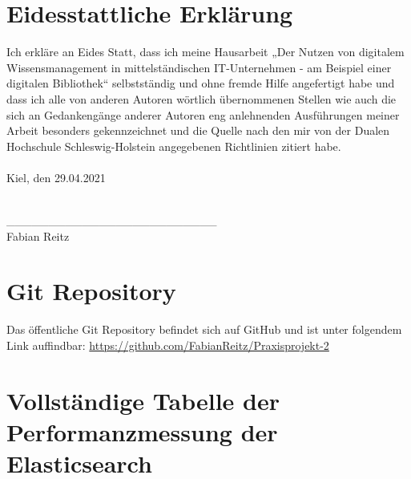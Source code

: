 \documentclass[a4paper]{scrartcl}
\begin{document}

\section*{Eidesstattliche Erklärung}


\onehalfspacing

Ich erkläre an Eides Statt, dass ich meine Hausarbeit „Der Nutzen von digitalem Wissensmanagement in mittelständischen IT-Unternehmen - am Beispiel einer digitalen Bibliothek“ selbstständig und ohne fremde Hilfe angefertigt habe und dass ich alle von anderen Autoren wörtlich übernommenen Stellen wie auch die sich an Gedankengänge anderer Autoren eng anlehnenden Ausführungen meiner Arbeit besonders gekennzeichnet und die Quelle nach den mir von der Dualen Hochschule Schleswig-Holstein angegebenen Richtlinien zitiert habe. \\ \\

Kiel, den 29.04.2021 \\ \\ 

\begin{tabbing}
	\_\_\_\_\_\_\_\_\_\_\_\_\_\_\_\_\_\_\_\_\_\_\_\_\_ \\
	Fabian Reitz
\end{tabbing}


\newpage

\appendix
\section{Git Repository}
Das öffentliche Git Repository befindet sich auf GitHub und ist unter folgendem Link auffindbar: \href{https://github.com/FabianReitz/Praxisprojekt-2}{https://github.com/FabianReitz/Praxisprojekt-2}

\section{Vollständige Tabelle der Performanzmessung der Elasticsearch}
\end{document}
